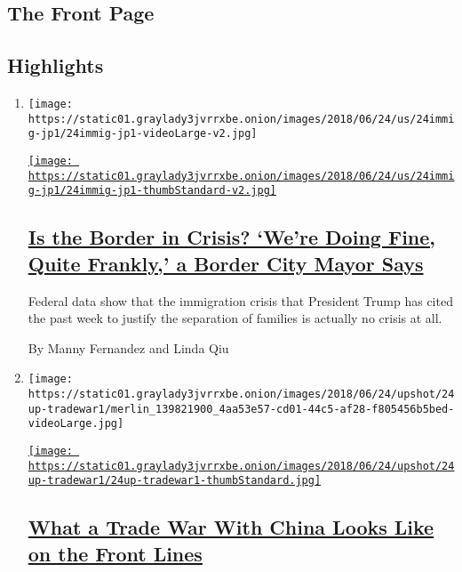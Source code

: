 \hypertarget{the-front-page}{%
\subsection{The Front Page}\label{the-front-page}}

\hypertarget{highlights}{%
\subsection{Highlights}\label{highlights}}

\begin{enumerate}
\def\labelenumi{\arabic{enumi}.}
\item
  \texttt{[image: https://static01.graylady3jvrrxbe.onion/images/2018/06/24/us/24immig-jp1/24immig-jp1-videoLarge-v2.jpg]}

  \href{/2018/06/23/us/border-trump-immigration.html}{\texttt{[image: https://static01.graylady3jvrrxbe.onion/images/2018/06/24/us/24immig-jp1/24immig-jp1-thumbStandard-v2.jpg]}}

  \hypertarget{is-the-border-in-crisis-were-doing-fine-quite-frankly-a-border-city-mayor-says}{%
  \subsection{\texorpdfstring{\href{/2018/06/23/us/border-trump-immigration.html}{Is
  the Border in Crisis? `We're Doing Fine, Quite Frankly,' a Border City
  Mayor
  Says}}{Is the Border in Crisis? `We're Doing Fine, Quite Frankly,' a Border City Mayor Says}}\label{is-the-border-in-crisis-were-doing-fine-quite-frankly-a-border-city-mayor-says}}

  Federal data show that the immigration crisis that President Trump has
  cited the past week to justify the separation of families is actually
  no crisis at all.

  By Manny Fernandez and Linda Qiu
\item
  \texttt{[image: https://static01.graylady3jvrrxbe.onion/images/2018/06/24/upshot/24up-tradewar1/merlin\_139821900\_4aa53e57-cd01-44c5-af28-f805456b5bed-videoLarge.jpg]}

  \href{/2018/06/23/upshot/what-a-trade-war-with-china-looks-like-on-the-front-lines.html}{\texttt{[image: https://static01.graylady3jvrrxbe.onion/images/2018/06/24/upshot/24up-tradewar1/24up-tradewar1-thumbStandard.jpg]}}

  \hypertarget{what-a-trade-war-with-china-looks-like-on-the-front-lines}{%
  \subsection{\texorpdfstring{\href{/2018/06/23/upshot/what-a-trade-war-with-china-looks-like-on-the-front-lines.html}{What
  a Trade War With China Looks Like on the Front
  Lines}}{What a Trade War With China Looks Like on the Front Lines}}\label{what-a-trade-war-with-china-looks-like-on-the-front-lines}}


\end{enumerate}
